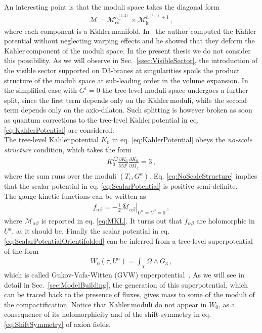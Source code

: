 \documentclass[12pt,a4paper]{book}
\newcommand{\Kahler}{\ensuremath{\text{K}\ddot{\text{a}}\text{hler}\,}}
\begin{document}
An interesting point is that the moduli space takes the diagonal form
\begin{align}
\label{eq:ModuliSpace}
\mathcal{M} = \mathcal{M}_{\text{cs}}^{h_-^{(1,2)}} \times \mathcal{M}_{\text{k}}^{h_-^{(1,1)} + 1}\,,
\end{align}
where each component is a \Kahler manifold. In~\cite{Martucci:2014ska} the author computed the \Kahler potential without neglecting warping effects and he showed that they deform the \Kahler component of the moduli space. In the present thesis we do not consider this possibility. As we will observe in Sec.~\ref{ssec:VisibleSector}, the introduction of the visible sector supported on D3-branes at singularities spoils the product structure of the moduli space at sub-leading order in the volume expansion. In the simplified case with $G^{\iota} = 0$ the tree-level moduli space undergoes a further split, since the first term depends only on the \Kahler moduli, while the second term depends only on the axio-dilaton. Such splitting is however broken as soon as quantum corrections to the tree-level \Kahler potential in eq. \eqref{eq:KahlerPotential} are considered.\\

The tree-level \Kahler potential $K_0$ in eq. \eqref{eq:KahlerPotential} obeys the \textit{no-scale structure} condition, which takes the form
\begin{align}
\label{eq:NoScaleStructure}
K_0^{I \overline{J}} \frac{\partial K_0}{\partial M^I} \frac{\partial K_0}{\partial \overline{M}_{\overline{J}}} = 3\,,
\end{align}
where the sum runs over the moduli $(T_i, G^{\kappa})$. Eq. \eqref{eq:NoScaleStructure} implies that the scalar potential in eq. \eqref{eq:ScalarPotential} is positive semi-definite.\\

The gauge kinetic functions can be written as
\begin{align}
\label{eq:GaugeKineticFunctions}
f_{\alpha \beta} = -\frac{i}{2} \left.\overline{\mathcal{M}}_{\alpha \beta}\right|_{U^\alpha = \overline{U}^\alpha = 0} \,,
\end{align}
where $\mathcal{M}_{\alpha \beta}$ is reported in eq. \eqref{eq:MKL}. It turns out that $f_{\alpha \beta}$ are holomorphic in $U^a$, as it should be. Finally the scalar potential in eq. \eqref{eq:ScalarPotentialOrientifolded} can be inferred from a tree-level superpotential of the form
\begin{align}
\label{eq:TreeLevelSuperpotential}
W_0 (\tau, U^a) = \int_\chi \Omega \wedge G_3 \,,
\end{align}
which is called Gukov-Vafa-Witten (GVW) superpotential~\cite{Gukov:1999ya}. As we will see in detail in Sec.~\ref{sec:ModelBuilding}, the generation of this superpotential, which can be traced back to the presence of fluxes, gives mass to some of the moduli of the compactification. Notice that \Kahler moduli do not appear in $W_0$, as a consequence of its holomorphicity and of the shift-symmetry in eq. \eqref{eq:ShiftSymmetry} of axion fields.
\end{document}
